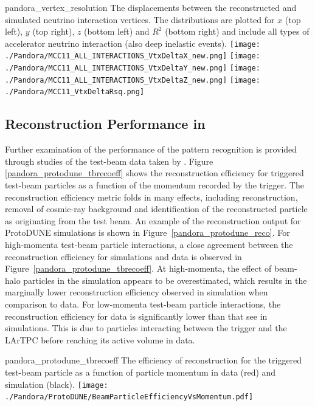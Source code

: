 \begin{dunefigure}
{pandora_vertex_resolution}
{The displacements between the reconstructed and simulated neutrino interaction vertices. The distributions are plotted for $x$ (top left), $y$ (top right), $z$ (bottom left) and $R^2$ (bottom right) and include all types of accelerator neutrino interaction (also deep inelastic events).}
\texttt{[image: ./Pandora/MCC11\_ALL\_INTERACTIONS\_VtxDeltaX\_new.png]}
\texttt{[image: ./Pandora/MCC11\_ALL\_INTERACTIONS\_VtxDeltaY\_new.png]}
\texttt{[image: ./Pandora/MCC11\_ALL\_INTERACTIONS\_VtxDeltaZ\_new.png]}
\texttt{[image: ./Pandora/MCC11\_VtxDeltaRsq.png]}
\end{dunefigure}

\subsection{Reconstruction Performance in }
\label{sec:Pandora:ProtoDUNE}

Further examination of the performance of the  pattern recognition is provided through studies of the test-beam data taken by .  Figure \ref{pandora_protodune_tbrecoeff} shows the reconstruction efficiency for triggered test-beam particles as a function of the momentum recorded by the trigger.  The reconstruction efficiency metric folds in many effects, including reconstruction, removal of cosmic-ray background and identification of the reconstructed particle as originating from the test beam.  An example of the  reconstruction output for ProtoDUNE  simulations is shown in Figure~\ref{pandora_protodune_reco}.  For high-momenta test-beam particle interactions, a close agreement between the reconstruction efficiency for  simulations and data is observed in Figure~\ref{pandora_protodune_tbrecoeff}.  At high-momenta, the effect of beam-halo particles in the simulation appears to be overestimated, which results in the marginally lower reconstruction efficiency observed in simulation when comparison to data.  For low-momenta test-beam particle interactions, the reconstruction efficiency for data is significantly lower than that see in  simulations.  This is due to particles interacting between the trigger and the LArTPC before reaching its active volume in data.

\begin{dunefigure}
{pandora_protodune_tbrecoeff}
{The efficiency of reconstruction for the triggered test-beam particle as a function of particle momentum in data (red) and simulation (black).}
\texttt{[image: ./Pandora/ProtoDUNE/BeamParticleEfficiencyVsMomentum.pdf]}
\end{dunefigure}




